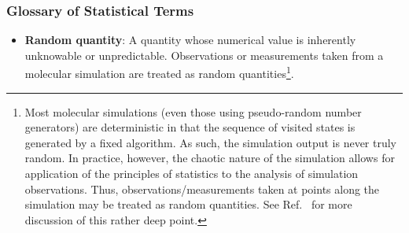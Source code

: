 \subsubsection{Glossary of Statistical Terms}
\begin{itemize}

\item {\bf Random quantity}: A quantity whose numerical value is inherently unknowable or unpredictable.
  Observations or measurements taken from a molecular simulation are treated as random quantities\footnote{Most molecular simulations (even those using pseudo-random number generators) are deterministic in that the sequence of visited states is generated by a fixed algorithm.  As such, the simulation output is never truly random.
In practice, however, the chaotic nature of the simulation allows for application of the principles of statistics to the analysis of simulation observations.
Thus, observations/measurements taken at points along the simulation may be treated as random quantities.
See Ref.~\cite{Leimkuhler} for more discussion of this rather deep point.}.

%




\end{itemize}
